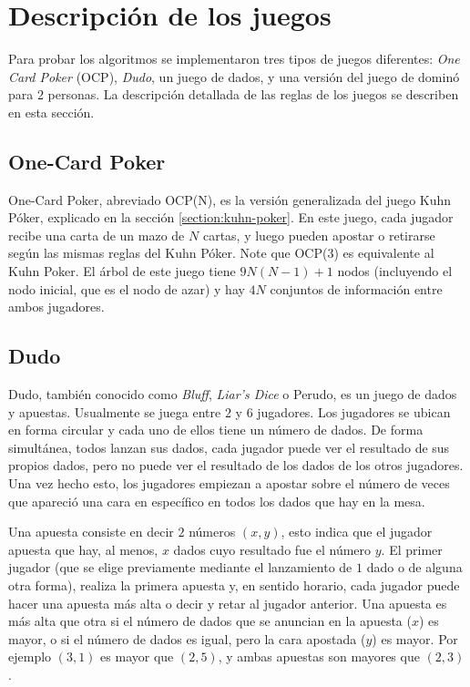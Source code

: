 \section{Descripción de los juegos}
\label{section-description-juegos-forma-extensiva}

Para probar los algoritmos se implementaron tres tipos de juegos diferentes: \textit{One Card Poker} (OCP), \textit{Dudo}, un juego de dados, y una versión del juego de dominó para $2$ personas. La descripción detallada de las reglas de los juegos se describen en esta sección.

\subsection{One-Card Poker}
One-Card Poker, abreviado OCP(N), es la versión generalizada del juego Kuhn Póker, explicado en la sección \ref{section:kuhn-poker}. En este juego, cada jugador recibe una carta de un mazo de $N$ cartas, y luego pueden apostar o retirarse según las mismas reglas del Kuhn Póker. Note que OCP(3) es equivalente al Kuhn Poker. El árbol de este juego tiene $9N(N-1)+1$ nodos (incluyendo el nodo inicial, que es el nodo de azar) y hay $4N$ conjuntos de información entre ambos jugadores. 

\subsection{Dudo}
Dudo, también conocido como \textit{Bluff}, \textit{Liar's Dice} o Perudo, es un juego de dados y apuestas. Usualmente se juega entre $2$ y $6$ jugadores. Los jugadores se ubican en forma circular y cada uno de ellos tiene un número de dados. De forma simultánea, todos lanzan sus dados, cada jugador puede ver el resultado de sus propios dados, pero no puede ver el resultado de los dados de los otros jugadores. Una vez hecho esto, los jugadores empiezan a apostar sobre el número de veces que apareció una cara en específico en todos los dados que hay en la mesa.

Una apuesta consiste en decir $2$ números $(x, y)$, esto indica que el jugador apuesta que hay, al menos, $x$ dados cuyo resultado fue el número $y$. El primer jugador (que se elige previamente mediante el lanzamiento de $1$ dado o de alguna otra forma), realiza la primera apuesta y, en sentido horario, cada jugador puede hacer una apuesta más alta o decir  y retar al jugador anterior. Una apuesta es más alta que otra si el número de dados que se anuncian en la apuesta ($x$) es mayor, o si el número de dados es igual, pero la cara apostada ($y$) es mayor. Por ejemplo $(3, 1)$ es mayor que $(2, 5)$, y ambas apuestas son mayores que $(2, 3)$.

